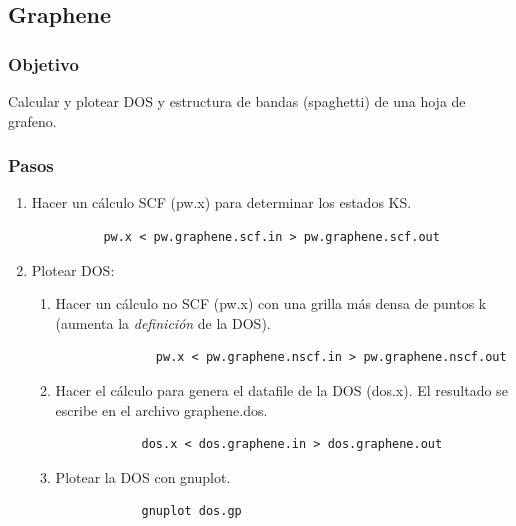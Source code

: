 \subsection{Graphene}

\subsubsection{Objetivo}

  Calcular y plotear DOS y estructura de bandas (spaghetti) de una hoja de grafeno.

\subsubsection{Pasos}

    \begin{enumerate}
      \item Hacer un cálculo SCF (pw.x) para determinar los estados KS.
        \begin{verbatim}
          pw.x < pw.graphene.scf.in > pw.graphene.scf.out
        \end{verbatim}

      \item Plotear DOS:
        \begin{enumerate}
          \item Hacer un cálculo no SCF (pw.x) con una grilla más densa de puntos k (aumenta la \emph{definición} de la DOS).
            \begin{verbatim}
              pw.x < pw.graphene.nscf.in > pw.graphene.nscf.out
            \end{verbatim}
        \item Hacer el cálculo para genera el datafile de la DOS (dos.x). El resultado se escribe en el archivo graphene.dos.
          \begin{verbatim}
            dos.x < dos.graphene.in > dos.graphene.out
          \end{verbatim}
        \item Plotear la DOS con gnuplot.
          \begin{verbatim}
            gnuplot dos.gp
          \end{verbatim}
        \end{enumerate}


\end{enumerate}
